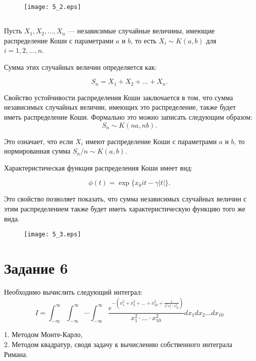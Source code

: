 \documentclass[11pt]{article}
\begin{document}
\begin{figure}[ht]
    \texttt{[image: 5\_2.eps]} 
    \caption{}
\end{figure} 

\FloatBarrier

\subsection{}
Пусть $X_1, X_2, \ldots, X_n$ — независимые случайные величины, имеющие распределение Коши с параметрами $a$ и $b$, то есть $X_i \sim K(a, b)$ для $i = 1, 2, \ldots, n$. 

Сумма этих случайных величин определяется как:

$$
S_n = X_1 + X_2 + \ldots + X_n.
$$


Свойство устойчивости распределения Коши заключается в том, что сумма независимых случайных величин, имеющих это распределение, также будет иметь распределение Коши. Формально это можно записать следующим образом:
$$
S_n \sim K(na, nb).
$$


Это означает, что если $X_i$ имеют распределение Коши с параметрами $a$ и $b$, то нормированная сумма $S_n / n \sim K(a, b)$.


Характеристическая функция распределения Коши имеет вид:

$$
\phi(t) = \exp \{ x_0 i t - \gamma |t|\}.
$$


Это свойство позволяет показать, что сумма независимых случайных величин с этим распределением также будет иметь характеристическую функцию того же вида.

\begin{figure}[ht]
    \texttt{[image: 5\_3.eps]} 
    \caption{}
\end{figure} 

\FloatBarrier



\section{Задание 6}
Необходимо вычислить следующий интеграл:
$$
I = \int_{-\infty}^{\infty}\int_{-\infty}^{\infty}\cdots\int_{-\infty}^{\infty}
\dfrac{e^{-(x_1^2+x_2^2+\dots+x_{10}^2 + \frac{1}{2^7 x_1^2\cdots x_{10}^2})}}{x_1^2\cdot\ldots\cdot x_{10}^2}
dx_1dx_2\dots dx_{10}
$$

1. Методом Монте-Карло, \\
2. Методом квадратур, сводя задачу к вычислению собственного интеграла Римана.
\end{document}
